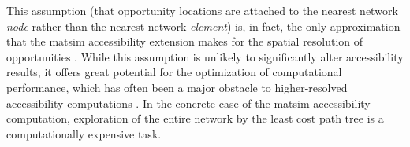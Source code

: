 %
%

%
%
This assumption (\ie that opportunity locations are attached to the nearest network \emph{node} rather than
the nearest network \emph{element}) is, in fact, the only approximation that the \gls{matsim} accessibility
extension makes for the spatial resolution of opportunities 
\citep{NicolaiNagelHiResAccessibilityMethod}. While this assumption is unlikely to significantly alter accessibility 
results, it offers great potential for the optimization of computational performance, which
has often been a major obstacle to higher-resolved accessibility computations
\citep{Kwan1998PointBasedAccessibility, BuettnerEtAl2010Erreichbarkeitsatlas}. 
In the concrete case of the \gls{matsim} accessibility computation, exploration of the entire network 
by the least cost path tree is a computationally expensive task.

